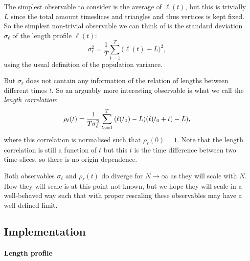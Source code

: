 The simplest observable to consider is the average of $\ell(t)$, but this is trivially $L$ since the total amount timeslices and triangles and thus vertices is kept fixed.
So the simplest non-trivial observable we can think of is the standard deviation $\sigma_\ell$ of the length profile $\ell(t)$:
\begin{equation}
    \sigma_\ell^2 = \frac{1}{T} \sum_{t = 1}^{T} \Big(\ell(t) - L\Big)^2,
\end{equation}
using the usual definition of the population variance.

But $\sigma_\ell$ does not contain any information of the relation of lengths between different times $t$.
So an arguably more interesting observable is what we call the \emph{length correlation}:
\begin{equation}
    \rho_\ell(t) = \frac{1}{T \sigma_\ell^2} \sum_{t_0 = 1}^{T} \qty(\ell(t_0) - L)\qty(\ell(t_0 + t) - L),
\end{equation}
where this correlation is normalised such that $\rho_\ell(0) = 1$.
Note that the length correlation is still a function of $t$ but this $t$ is the time difference between two time-slices, so there is no origin dependence.

Both observables $\sigma_\ell$ and $\rho_\ell(t)$ do diverge for $N \rightarrow \infty$ as they will scale with $N$.
How they will scale is at this point not known, but we hope they will scale in a well-behaved way such that with proper rescaling these observables may have a well-defined limit.

\subsection{Implementation}

\paragraph{Length profile}
